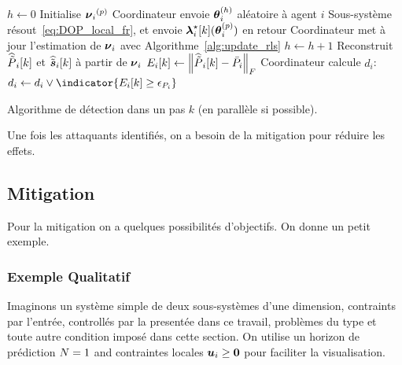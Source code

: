 \documentclass[../main.tex]{subfiles}
\begin{document}
\begin{algorithm2e}[h]
  \DontPrintSemicolon%
  $h\gets0$\;
  Initialise ${\boldsymbol{\nu}_{i}}^{(p)}$\;
  \Repeter{$\norm{\rlsparam\hplusone-\rlsparam\h}\leq\epsilon_{\rlsparam}$}
  {
    Coordinateur envoie $\boldsymbol{\theta}_{i}^{(h)}$ aléatoire à agent $i$ \;
    Sous-système résout~\eqref{eq:DOP_local_fr}, et envoie  $\lambdaikstar(\thetai\p)$ en retour\;
    Coordinateur met à jour l'estimation de ${\boldsymbol{\nu}_{i}}$ avec Algorithme~\ref{alg:update_rls}\;
    $h\gets h+1$\;
  }
  Reconstruit $\widehat{\tilde{P}}_{i}[k]$ et $\widehat{\tilde{\boldsymbol{s}}}_{i}[k]$ à partir de ${\boldsymbol{\nu}_{i}}$\;
  $E_{i}[k]\gets\left\lVert\widehat{\tilde{P}}_{i}[k]-\bar{{P}}_{i}\right\rVert_{F}$\;
  Coordinateur calcule $d_{i}$: $d_{i}\gets d_{i}\lor \indicator{E_{i}[k]\geq\epsilon_{\Plin}}$\;

  \caption{Algorithme de détection dans un pas $k$ (en parallèle si possible).}\label{alg:detection_rls_fr}
\end{algorithm2e}

Une fois les attaquants identifiés, on a besoin de la mitigation pour réduire les effets.

\newpage
\subsection{Mitigation}\label{sec:mitigation_fr}
Pour la mitigation on a quelques possibilités d'objectifs.
On donne un petit exemple.

\subsubsection{Exemple Qualitatif}\label{sec:qualitative-example_fr}

Imaginons un système simple de deux sous-systèmes \ltidt{} d'une dimension, contraints par l'entrée, controllés par la \dmpc{} presentée dans ce travail, problèmes du type \qp{} et toute autre condition imposé dans cette section.
On utilise un horizon de prédiction $N=1$ and contraintes locales $\boldsymbol{u}_{i}\geq\mathbf{0}$ pour faciliter la visualisation.
\end{document}
